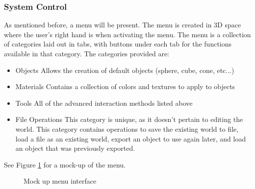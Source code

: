 \subsubsection{System Control}
\label{Design:Interaction:SystemControl}
As mentioned before, a menu will be present.
The menu is created in 3D space where the user's right hand is when activating the menu.
The menu is a collection of categories laid out in tabs, with buttons under each tab for the functions available in that category.
The categories provided are:
\begin{itemize}
	\item Objects
	\subitem Allows the creation of default objects (sphere, cube, cone, etc...)
	\item Materials
	\subitem Contains a collection of colors and textures to apply to objects
	\item Tools
	\subitem All of the advanced interaction methods listed above
	\item File Operations
	\subitem This category is unique, as it doesn't pertain to editing the world.  This category contains operations to save the existing world to file, load a file as an existing world, export an object to use again later, and load an object that was previously exported.
\end{itemize}


See Figure \ref{fig:menu} for a mock-up of the menu.

\begin{figure}[hp]
	\centering
	\caption{Mock up menu interface}
	\label{fig:menu}
\end{figure}